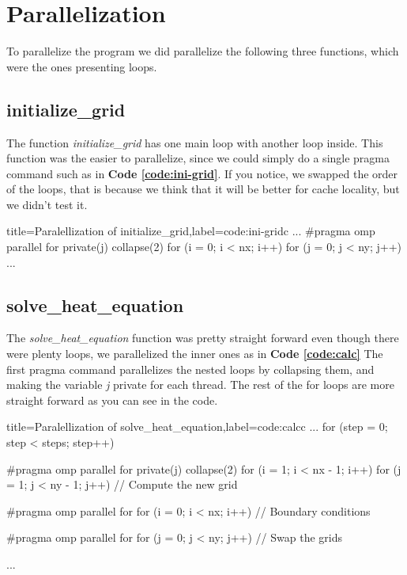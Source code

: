 \documentclass[../main.tex]{subfiles}
\begin{document}
\section{Parallelization}

To parallelize the program we did parallelize the following three functions, which were the ones presenting loops.

\subsection{initialize\_grid}

The function \textit{initialize\_grid} has one main loop with another loop inside. This function was the easier to parallelize, since we could simply do a single pragma command such as in \textbf{Code \ref{code:ini-grid}}. If you notice, we swapped the order of the loops, that is because we think that it will be better for cache locality, but we didn't test it.

\begin{code}[numbers=left]{title=Paralellization of initialize\_grid,label=code:ini-grid}{c}
    ...
    #pragma omp parallel for private(j) collapse(2)
    for (i = 0; i < nx; i++)
        for (j = 0; j < ny; j++)
    ...
\end{code}

\subsection{solve\_heat\_equation}

The \textit{solve\_heat\_equation} function was pretty straight forward even though there were plenty loops, we parallelized the inner ones as in \textbf{Code \ref{code:calc}} The first pragma command parallelizes the nested loops by collapsing them, and making the variable \textit{j} private for each thread. The rest of the for loops are more straight forward as you can see in the code.

\begin{code}[numbers=left]{title=Paralellization of solve\_heat\_equation,label=code:calc}{c}
    ...
    for (step = 0; step < steps; step++)
    {
        #pragma omp parallel for private(j) collapse(2)
        for (i = 1; i < nx - 1; i++)
            for (j = 1; j < ny - 1; j++)
                // Compute the new grid

        #pragma omp parallel for
        for (i = 0; i < nx; i++)
            // Boundary conditions

        #pragma omp parallel for
        for (j = 0; j < ny; j++)
            // Swap the grids
        
        ...
    }
\end{code}
\end{document}
